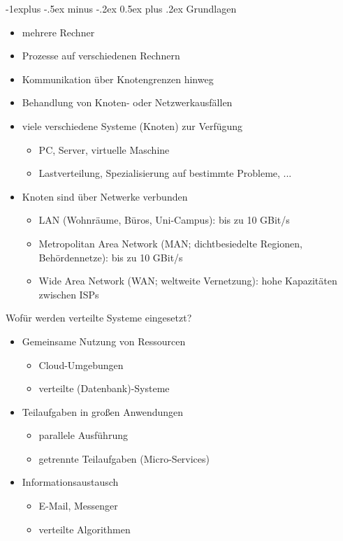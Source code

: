 \documentclass[10pt]{article}
\makeatletter
\renewcommand{\subsection}{\@startsection{subsection}{2}{0mm}%
                                {-1explus -.5ex minus -.2ex}%
                                {0.5ex plus .2ex}%
                                {\normalfont\normalsize\bfseries}}
\makeatother
\begin{document}
\subsection{Grundlagen}
\begin{itemize}
  \item mehrere Rechner
  \item Prozesse auf verschiedenen Rechnern
  \item Kommunikation über Knotengrenzen hinweg
  \item Behandlung von Knoten- oder Netzwerkausfällen
\end{itemize}

\begin{itemize}
  \item viele verschiedene Systeme (Knoten) zur Verfügung
        \begin{itemize}
          \item PC, Server, virtuelle Maschine
          \item Lastverteilung, Spezialisierung auf bestimmte Probleme, ...
        \end{itemize}
  \item Knoten sind über Netwerke verbunden
        \begin{itemize}
          \item LAN (Wohnräume, Büros, Uni-Campus): bis zu 10 GBit/s
          \item Metropolitan Area Network (MAN; dichtbesiedelte Regionen, Behördennetze): bis zu 10 GBit/s
          \item Wide Area Network (WAN; weltweite Vernetzung): hohe Kapazitäten zwischen ISPs
        \end{itemize}
\end{itemize}

Wofür werden verteilte Systeme eingesetzt?
\begin{itemize}
  \item Gemeinsame Nutzung von Ressourcen
        \begin{itemize}
          \item Cloud-Umgebungen
          \item verteilte (Datenbank)-Systeme
        \end{itemize}
  \item Teilaufgaben in großen Anwendungen
        \begin{itemize}
          \item parallele Ausführung
          \item getrennte Teilaufgaben (Micro-Services)
        \end{itemize}
  \item Informationsaustausch
        \begin{itemize}
          \item E-Mail, Messenger
          \item verteilte Algorithmen
        \end{itemize}
\end{itemize}
\end{document}
